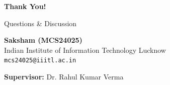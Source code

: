 \documentclass[aspectratio=169]{beamer}
\begin{document}
\begin{frame}[plain]
\begin{center}
\Huge \textcolor{iiitlblue}{\textbf{Thank You!}}

\vspace{1.5cm}
\Large Questions \& Discussion

\vspace{2cm}
\normalsize
\textbf{Saksham (MCS24025)}\\
\vspace{0.3cm}
Indian Institute of Information Technology Lucknow\\
\vspace{0.3cm}
\texttt{mcs24025@iiitl.ac.in}

\vspace{0.8cm}
\textbf{Supervisor:} Dr. Rahul Kumar Verma
\end{center}
\end{frame}
\end{document}
